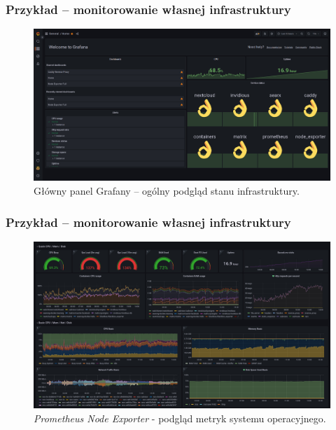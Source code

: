 \documentclass[]{beamer}
\begin{document}
\begin{frame}
  \frametitle{Przykład -- monitorowanie własnej infrastruktury}
  \begin{figure}
    \centering
    \includegraphics[width=1.0\linewidth]{grafana_dashboard_main.jpg}
    \caption{Główny panel Grafany -- ogólny podgląd stanu infrastruktury.}
  \end{figure}
\end{frame}

\begin{frame}
  \frametitle{Przykład -- monitorowanie własnej infrastruktury}
  \begin{figure}
    \centering
    \includegraphics[width=1.0\linewidth]{grafana_node_exporter.jpg}
    \caption{\textit{Prometheus Node Exporter} - podgląd metryk systemu operacyjnego.}
  \end{figure}
\end{frame}
\end{document}

